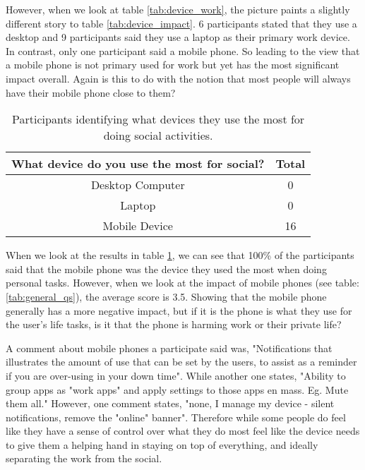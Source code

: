 \documentclass{sigchi}
\begin{document}
	However, when we look at table \ref{tab:device_work}, the picture paints a slightly different story to table \ref{tab:device_impact}. 6 participants stated that they use a desktop and 9 participants said they use a laptop as their primary work device. In contrast, only one participant said a mobile phone. So leading to the view that a mobile phone is not primary used for work but yet has the most significant impact overall. Again is this to do with the notion that most people will always have their mobile phone close to them?
	
	
	\begin{table}[ht]
		\centering
		\small
		\begin{tabular}[t]{ |c| c | }
			\hline
			What device do you use the most for social? & Total  \\ 
			\hline
			Desktop Computer & 0 \\ 
			\hline
			Laptop & 0  \\ 
			\hline
			Mobile Device &  16 \\
			\hline
		\end{tabular}
		\caption{Participants identifying what devices they use the most for doing social activities.}
		\label{tab:device_social}
	\end{table}%

	When we look at the results in table \ref{tab:device_social}, we can see that 100\% of the participants said that the mobile phone was the device they used the most when doing personal tasks. However, when we look at the impact of mobile phones (see table: \ref{tab:general_qs}), the average score is 3.5. Showing that the mobile phone generally has a more negative impact, but if it is the phone is what they use for the user's life tasks, is it that the phone is harming work or their private life? 
	
	A comment about mobile phones a participate said was, "Notifications that illustrates the amount of use that can be set by the users, to assist as a reminder if you are over-using in your down time". While another one states, "Ability to group apps as "work apps" and apply settings to those apps en mass. Eg. Mute them all." However, one comment states, "none, I manage my device - silent notifications, remove the "online" banner". Therefore while some people do feel like they have a sense of control over what they do most feel like the device needs to give them a helping hand in staying on top of everything, and ideally separating the work from the social.
\end{document}
